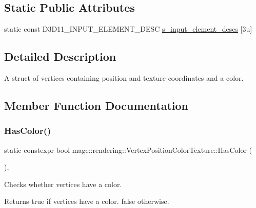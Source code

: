 \subsection*{Static Public Attributes}
\begin{DoxyCompactItemize}
\item 
static const D3\+D11\+\_\+\+I\+N\+P\+U\+T\+\_\+\+E\+L\+E\+M\+E\+N\+T\+\_\+\+D\+E\+SC \mbox{\hyperlink{structmage_1_1rendering_1_1_vertex_position_color_texture_ac9fd3be6b7e8aa81e0ab17720b2a07f6}{s\+\_\+input\+\_\+element\+\_\+descs}} \mbox{[}3u\mbox{]}
\end{DoxyCompactItemize}


\subsection{Detailed Description}
A struct of vertices containing position and texture coordinates and a color. 

\subsection{Member Function Documentation}
\mbox{\label{structmage_1_1rendering_1_1_vertex_position_color_texture_a1d3db6f6fb5a93ce596e7157fc204f81}} 
\subsubsection{\texorpdfstring{Has\+Color()}{HasColor()}}
{\footnotesize\ttfamily static constexpr bool mage\+::rendering\+::\+Vertex\+Position\+Color\+Texture\+::\+Has\+Color (\begin{DoxyParamCaption}{ }\end{DoxyParamCaption})\hspace{0.3cm}{\ttfamily [static]}, {\ttfamily [noexcept]}}

Checks whether vertices have a color.

\begin{DoxyReturn}{Returns}
{\ttfamily true} if vertices have a color. {\ttfamily false} otherwise. 
\end{DoxyReturn}
\mbox{\label{structmage_1_1rendering_1_1_vertex_position_color_texture_a3823f3163d8350e4c448e99e90cc9436}} 
